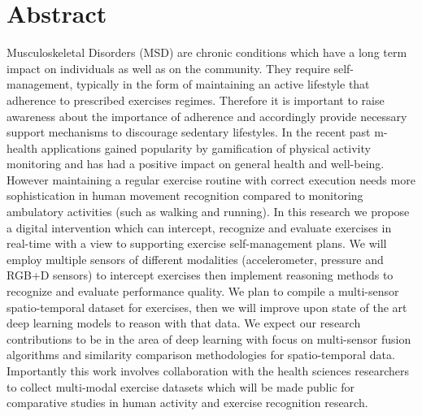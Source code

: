\section*{Abstract}

Musculoskeletal Disorders (MSD) are chronic conditions which have a long term impact on individuals as well as on the community. They require self-management, typically in the form of maintaining an active lifestyle that adherence to prescribed exercises regimes. Therefore it is important to raise awareness about the importance of adherence and accordingly provide necessary support mechanisms to discourage sedentary lifestyles. In the recent past m-health applications gained popularity by gamification of physical activity monitoring and has had a positive impact on general health and well-being. However maintaining a regular exercise routine with correct execution needs more sophistication in human movement recognition compared to monitoring ambulatory activities (such as walking and running). In this research we propose a digital intervention which can intercept, recognize and evaluate exercises in real-time with a view to supporting exercise self-management plans. We will employ multiple sensors of different modalities (accelerometer, pressure and RGB+D sensors) to intercept exercises then implement reasoning methods to recognize and evaluate performance quality. We plan to compile a multi-sensor spatio-temporal dataset for exercises, then we will improve upon state of the art deep learning models to reason with that data. We expect our research contributions to be in the area of deep learning with focus on multi-sensor fusion algorithms and similarity comparison methodologies for spatio-temporal data. Importantly this work involves collaboration with the health sciences researchers to collect multi-modal exercise datasets which will be made public for comparative studies in human activity and exercise recognition research.